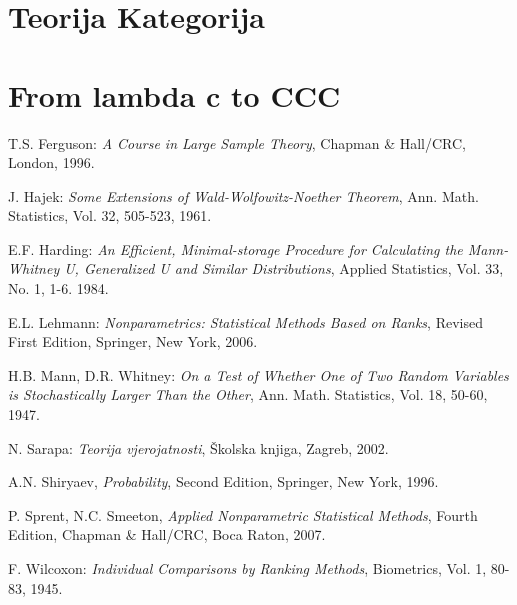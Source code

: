 \documentclass[ a4paper, 12pt]{report}
\theoremstyle{definition}
\numberwithin{Primjer}{chapter}
\renewcommand{\theequation}{\arabic{chapter}.\arabic{section}.\arabic{equation}}
\begin{document}
%


%
%
\newpage
{} \setcounter{page}{1}
\tableofcontents
%
%

%
 \setcounter{page}{1}
%
%
\chapter{Teorija Kategorija}
%


\chapter{From lambda c to CCC}
%


%
%
\appendix
%
\renewcommand{\theequation}{A.\arabic{equation}}
%
%
\newpage
{}
\begin{thebibliography}{99}

 T.S. Ferguson:
\textit{A Course in Large Sample Theory},
Chapman \& Hall/CRC, London, 1996.

 J. Hajek:
\textit{Some Extensions of Wald-Wolfowitz-Noether Theorem},
Ann. Math. Statistics, Vol. 32, 505-523, 1961.

 E.F. Harding:
\textit{An Efficient, Minimal-storage Procedure for Calculating
the Mann-Whitney U, Generalized U and Similar Distributions},
Applied Statistics, Vol. 33, No. 1, 1-6. 1984.

 E.L. Lehmann:
\textit{Nonparametrics: Statistical Methods Based on Ranks},
Revised First Edition, Springer, New York, 2006.

 H.B. Mann, D.R. Whitney:
\textit{On a Test of Whether One of Two Random
Variables is Stochastically Larger Than the Other},
Ann. Math. Statistics, Vol. 18, 50-60, 1947.

 N. Sarapa: \textit{Teorija vjerojatnosti},
\v{S}kolska knjiga, Zagreb, 2002.

 A.N. Shiryaev, \textit{Probability},
Second Edition, Springer, New York, 1996.

 P. Sprent, N.C. Smeeton,
\textit{Applied Nonparametric Statistical Methods},
Fourth Edition, Chapman \& Hall/CRC, Boca Raton, 2007.

 F. Wilcoxon:
\textit{Individual Comparisons by Ranking Methods},
Biometrics, Vol. 1, 80-83, 1945.

\end{thebibliography}
%
\end{document}
